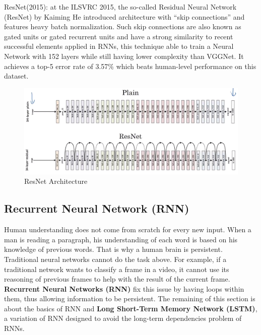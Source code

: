 ResNet(2015): at the ILSVRC 2015, the so-called Residual Neural Network (ResNet) by Kaiming He introduced architecture with “skip connections” and features heavy batch normalization. Such skip connections are also known as gated units or gated recurrent units and have a strong similarity to recent successful elements applied in RNNs, this technique able to train a Neural Network with 152 layers while still having lower complexity than VGGNet. It achieves a top-5 error rate of 3.57\% which beats human-level performance on this dataset.
\begin{center}
  \begin{figure}[H]
  \centering
  \includegraphics[width=1\columnwidth]{images/chap2/ResNet_Plain_Vs_Res.png}
  \caption{ResNet Architecture}
  \label{chap2:WSP}
  \end{figure}
\end{center}
\subsection{Recurrent Neural Network (RNN)}
Human understanding does not come from scratch for every new input. When a man is reading a paragraph, his understanding of each word is based on his knowledge of previous words. That is why a human brain is persistent.\\
Traditional neural networks cannot do the task above. For example, if a traditional network wants to classify a frame in a video, it cannot use its reasoning of previous frames to help with the result of the current frame.\\
\textbf{Recurrent Neural Networks (RNN)} fix this issue by having loops within them, thus allowing information to be persistent. The remaining of this section is about the basics of RNN and \textbf{Long Short-Term Memory Network (LSTM)}, a variation of RNN designed to avoid the long-term dependencies problem of RNNs.


